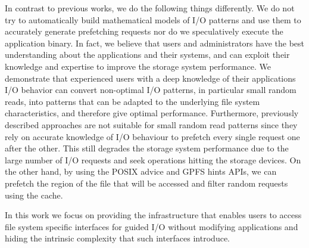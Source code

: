 In contrast to previous works, we do the following things differently. We do not try to automatically build mathematical models of I/O patterns and use them to accurately generate prefetching requests nor do we speculatively execute the application binary. In fact, we believe that users and administrators have the best understanding about the applications and their systems, and can exploit their knowledge and expertise to improve the storage system performance. We demonstrate that experienced users with a deep knowledge of their applications I/O behavior can convert non-optimal I/O patterns, in particular small random reads, into patterns that can be adapted to the underlying file system characteristics, and therefore give optimal performance. %
Furthermore, previously described approaches are not suitable for small random read patterns since they rely on accurate knowledge of I/O behaviour %
to prefetch every single request one after the other. This still degrades the storage system performance due to the large number of I/O requests and seek operations hitting the storage devices. On the other hand, by using the POSIX advice and GPFS hints APIs, we can prefetch the region of the file that will be accessed and filter random requests using the cache. %

In this work we focus on providing the infrastructure that enables users to access file system specific interfaces for guided I/O without modifying applications and hiding the intrinsic complexity that such interfaces introduce. %
